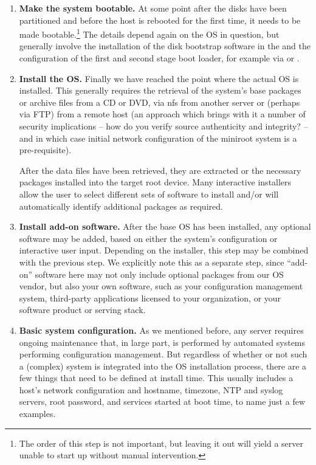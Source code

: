 \begin{enumerate}
	\item {\bf Make the system bootable.}  At some point after the disks
		have been partitioned and before the host is rebooted for
		the first time, it needs to be made bootable.\footnote{The order
		of this step is not important, but leaving it out
		will yield a server unable to start up without
		manual intervention.}  The details depend again on the OS
		in question, but generally involve the installation of the
		disk bootstrap software in the  and the configuration of the first and second
		stage boot loader, for example via  or
		.

	\item {\bf Install the OS.}  Finally we have reached the point
		where the actual OS is installed.  This generally requires
		the retrieval of the system's base packages or archive
		files from a CD or DVD, via \gls{nfs} from another server or
		(perhaps via FTP) from a remote host (an approach which
		brings with it a number of security implications --
		how do you verify source authenticity and integrity? --
		and in which case initial network configuration of the
		miniroot system is a pre-requisite).

		After the data files have been retrieved, they are
		extracted or the necessary packages installed into the
		target root device.  Many interactive installers allow the
		user to select different sets of software to install
		and/or will automatically identify additional packages as
		required.

	\item {\bf Install add-on software.} After the base OS has been
		installed, any optional software may be added, based on
		either the system's configuration or interactive user
		input.  Depending on the installer, this step may be
		combined with the previous step.  We explicitly note this
		as a separate step, since ``add-on'' software here may not
		only include optional packages from our OS vendor, but
		also your own software, such as your configuration
		management system, third-party applications licensed to
		your organization, or your software product or serving
		stack.

	\item {\bf Basic system configuration.}  As we mentioned before,
		any server requires ongoing maintenance that, in large
		part, is performed by automated systems performing
		configuration management.  But regardless of whether or
		not such a (complex) system is integrated into the OS
		installation process, there are a few things that need to
		be defined at install time.  This usually includes
		a host's network configuration and hostname, timezone, NTP
		and syslog servers, root password, and services started at
		boot time, to name just a few examples.


\end{enumerate}
